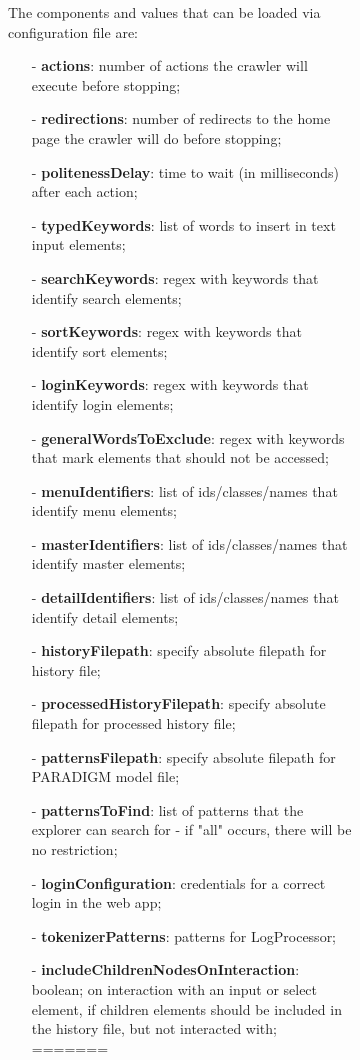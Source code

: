\documentclass[conference]{IEEEtran}
\begin{document}
\begin{enumerate}
\begin{figure}[!htb]
\begin{itemize}
\begin{figure}[!htb]
The components and values that can be loaded via configuration file are: 
\begin{itemize}
\item[-] \textbf{actions}: number of actions the crawler will execute before stopping;
\item[-] \textbf{redirections}: number of redirects to the home page the crawler will do before stopping; 
\item[-] \textbf{politenessDelay}: time to wait (in milliseconds) after each action;
\item[-] \textbf{typedKeywords}: list of words to insert in text input elements;
\item[-] \textbf{searchKeywords}: regex with keywords that identify search elements;
\item[-] \textbf{sortKeywords}: regex with keywords that identify sort elements;
\item[-] \textbf{loginKeywords}: regex with keywords that identify login elements;
\item[-] \textbf{generalWordsToExclude}: regex with keywords that mark elements that should not be accessed;
\item[-] \textbf{menuIdentifiers}: list of ids/classes/names that identify menu elements;
\item[-] \textbf{masterIdentifiers}: list of ids/classes/names that identify master elements;
\item[-] \textbf{detailIdentifiers}: list of ids/classes/names that identify detail elements;
\item[-] \textbf{historyFilepath}: specify absolute filepath for history file;
\item[-] \textbf{processedHistoryFilepath}: specify absolute filepath for processed history file;
\item[-] \textbf{patternsFilepath}: specify absolute filepath for PARADIGM model file;
\item[-] \textbf{patternsToFind}: list of patterns that the explorer can search for - if "all" occurs, there will be no restriction;
\item[-] \textbf{loginConfiguration}: credentials for a correct login in the web app;		
\item[-] \textbf{tokenizerPatterns}: patterns for LogProcessor;
\item[-] \textbf{includeChildrenNodesOnInteraction}: boolean; on interaction with an input or select element, if children elements should be included  in the history file, but not interacted with;
=======

\end{itemize}
\end{figure}
\end{itemize}
\end{figure}
\end{enumerate}
\end{document}
